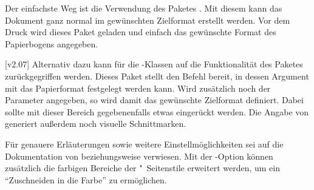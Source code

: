 Der einfachste Weg ist die Verwendung des Paketes . Mit diesem 
kann das Dokument ganz normal im gewünschten Zielformat erstellt werden. Vor 
dem Druck wird dieses Paket geladen und einfach das gewünschte Format des 
Papierbogens angegeben. 
%
\begin{quoting}[rightmargin=0pt]
\end{quoting}
%
[v2.07]%
Alternativ dazu kann für die \TUDScript-Klassen auf die Funktionalität des 
Paketes  zurückgegriffen werden. Dieses Paket stellt den 
Befehl  bereit, in dessen Argument mit
das Papierformat festgelegt werden kann. Wird zusätzlich noch der Parameter 
angegeben, so wird damit das gewünschte Zielformat definiert. Dabei sollte mit 
dieser Bereich gegebenenfalls etwas eingerückt werden. Die Angabe von 
 generiert außerdem noch visuelle 
Schnittmarken.
%
\begin{quoting}[rightmargin=0pt]
\end{quoting}
%
Für genauere Erläuterungen sowie weitere Einstellmöglichkeiten sei auf die 
Dokumentation von  beziehungsweise  verwiesen.
Mit der \TUDScript-Option  können zusätzlich die farbigen 
Bereiche der "~Seitenstile erweitert werden, um ein 
\enquote{Zuschneiden in die Farbe} zu ermöglichen.



